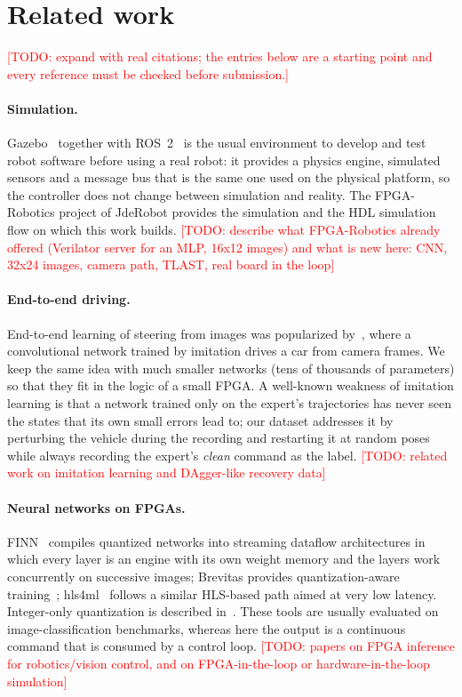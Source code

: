 \documentclass{article}
\newcommand{\TODO}[1]{\textcolor{red}{[TODO: #1]}}
\begin{document}
\section{Related work}
\label{sec:related}
\TODO{expand with real citations; the entries below are a starting point and every reference must be checked before submission.}

\paragraph{Simulation.}
Gazebo~\cite{koenig2004gazebo} together with ROS~2~\cite{macenski2022ros2} is the usual environment to develop and test robot software
before using a real robot: it provides a physics engine, simulated sensors and a message bus that is the same one used on the physical platform, so
the controller does not change between simulation and reality. The FPGA-Robotics project of JdeRobot provides the simulation and the HDL simulation flow
on which this work builds. \TODO{describe what FPGA-Robotics already offered (Verilator server for an MLP, 16x12 images) and what is new here: CNN, 32x24 images, camera path, TLAST, real board in the loop}

\paragraph{End-to-end driving.}
End-to-end learning of steering from images was popularized by~\cite{bojarski2016end}, where a convolutional network trained by imitation drives a car
from camera frames. We keep the same idea with much smaller networks (tens of thousands of parameters) so that they fit in the logic of a small FPGA.
A well-known weakness of imitation learning is that a network trained only on the expert's trajectories has never seen the states that its own small errors
lead to; our dataset addresses it by perturbing the vehicle during the recording and restarting it at random poses while always recording the expert's
\emph{clean} command as the label. \TODO{related work on imitation learning and DAgger-like recovery data}

\paragraph{Neural networks on FPGAs.}
FINN~\cite{umuroglu2017finn} compiles quantized networks into streaming dataflow architectures in which every layer is an engine with its own weight memory
and the layers work concurrently on successive images; Brevitas provides quantization-aware
training~\cite{brevitas}; hls4ml~\cite{duarte2018hls4ml} follows a similar HLS-based path aimed at very low latency. Integer-only quantization is described in~\cite{jacob2018quantization}.
These tools are usually evaluated on image-classification benchmarks, whereas here the output is a continuous command that is consumed by a control loop.
\TODO{papers on FPGA inference for robotics/vision control, and on FPGA-in-the-loop or hardware-in-the-loop simulation}
\end{document}
